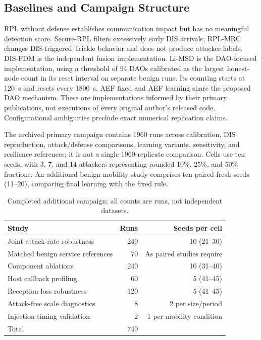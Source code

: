 \subsection{Baselines and Campaign Structure}
RPL without defense establishes communication impact but has no meaningful detection score. Secure-RPL filters excessively early DIS arrivals; RPL-MRC changes DIS-triggered Trickle behavior and does not produce attacker labels. DIS-FDM is the independent fusion implementation. Li-MSD is the DAO-focused implementation, using a threshold of 94 DAOs calibrated as the largest honest-node count in its reset interval on separate benign runs. Its counting starts at 120~s and resets every 1800~s. AEF fixed and AEF learning share the proposed DAO mechanism. These are implementations informed by their primary publications, not executions of every original author's released code. Configurational ambiguities preclude exact numerical replication claims.

The archived primary campaign contains 1960 runs across calibration, DIS reproduction, attack/defense comparisons, learning variants, sensitivity, and resilience references; it is not a single 1960-replicate comparison. Cells use ten seeds, with 3, 7, and 14 attackers representing rounded 10\%, 25\%, and 50\% fractions. An additional benign mobility study comprises ten paired fresh seeds (11--20), comparing final learning with the fixed rule.

\begin{table}[t]
\caption{Completed additional campaign; all counts are runs, not independent datasets.}\label{tab:campaigns}
\centering\footnotesize
\begin{tabularx}{\columnwidth}{@{}Xrr@{}}\toprule
Study & Runs & Seeds per cell \\\midrule
Joint attack-rate robustness & 240 & 10 (21--30)\\
Matched benign service references & 70 & As paired studies require\\
Component ablations & 240 & 10 (31--40)\\
Host callback profiling & 60 & 5 (41--45)\\
Reception-loss robustness & 120 & 5 (41--45)\\
Attack-free scale diagnostics & 8 & 2 per size/period\\
Injection-timing validation & 2 & 1 per mobility condition\\\midrule
Total & 740 & \\\bottomrule
\end{tabularx}
\end{table}

